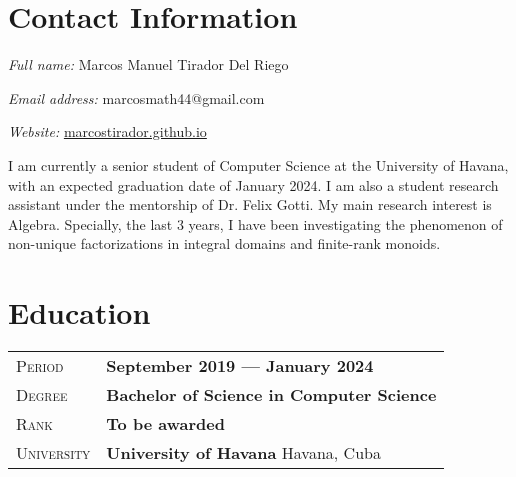 \documentclass[12pt]{amsart}
\theoremstyle{definition}
\numberwithin{equation}{section}
\newcommand{\gray}{\rowcolor[gray]{.90}} %
\begin{document}
	
	
	
%	
%	
	
		

\date{\today}

	

\section{Contact Information}
	\textit{Full name:} Marcos Manuel Tirador Del Riego
	
	\textit{Email address:} marcosmath44@gmail.com
	
	\textit{Website:} \href{marcostirador.github.io}{marcostirador.github.io}
	
	\vspace{0.5cm}
	
	I am currently a senior student of Computer Science at the University of Havana, with an expected graduation date of January 2024. I am also a student research assistant under the mentorship of Dr. Felix Gotti. My main research interest is Algebra. Specially, the last 3 years, I have been investigating the phenomenon of non-unique factorizations in integral domains and finite-rank monoids.
	
\section{Education}

	\begin{tabularx}{0.97\linewidth}{>{\raggedleft\scshape}p{2cm}X}
	\gray Period & \textbf{September 2019 --- January 2024}\\
	\gray Degree & \textbf{Bachelor of Science in Computer Science}\\
	\gray Rank & \textbf{To be awarded}\\
	\gray University & \textbf{University of Havana} \hfill Havana, Cuba\\
	\end{tabularx}
	
\end{document}

